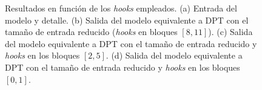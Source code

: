 \begin{figure}[!ht]
\hspace{-3mm}
    
\vspace{-3.5mm}

\hspace{-3mm}
       
\caption{Resultados en función de los \textit{hooks} empleados. (a) Entrada del modelo y detalle. (b) Salida del modelo equivalente a DPT con el tamaño de entrada reducido (\textit{hooks} en bloques $[8, 11]$). (c) Salida del modelo equivalente a DPT con el tamaño de entrada reducido y \textit{hooks} en los bloques $[2, 5]$. (d) Salida del modelo equivalente a DPT con el tamaño de entrada reducido y \textit{hooks} en los bloques $[0, 1]$.}
    \label{fig:cualitativa-4}
    \end{figure}
\captionsetup[subfigure]{labelformat=parens}








\clearpage